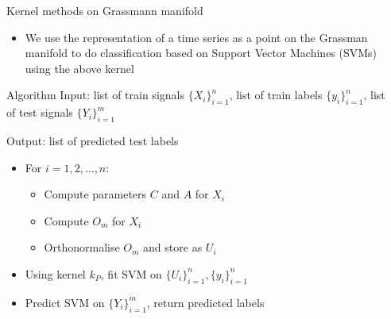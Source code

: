 \documentclass[final]{beamer}
\newlength{\sepwid}
\newlength{\onecolwid}
\begin{document}
\begin{frame}[t]
\begin{columns}[t]
\begin{column}{\onecolwid}
\begin{block}{Kernel methods on Grassmann manifold}
\begin{itemize}
            where $[Y_i]$ is the subspace spanned by the columns of $Y_i$, $Y_1$ and $Y_2$ are
            matrices with orthonormal columns, and $\gamma$ is a hyperparameter
        
        \item We use the representation of a time series as a point on the Grassman manifold  to do classification based on Support Vector Machines (SVMs) using the above kernel
        
    \end{itemize}
\end{block}


\begin{block}{Algorithm}
    Input: list of train signals $\{X_i\}_{i=1}^n$, list of train labels $\{y_i\}_{i=1}^n$, list of
    test signals $\{Y_i\}_{i=1}^m$

    Output: list of predicted test labels
    \begin{itemize}
        \item For $i = 1, 2, \dots, n$:

            \begin{itemize}
                \item Compute parameters $C$ and $A$ for $X_i$
                \item Compute $O_m$ for $X_i$
                \item Orthonormalise $O_m$ and store as $U_i$
            \end{itemize}

        \item Using kernel $k_P$, fit SVM on $\{U_i\}_{i=1}^n, \{y_i\}_{i=1}^n$

        \item Predict SVM on $\{Y_i\}_{i=1}^m$, return predicted labels
    \end{itemize}
\end{block}


\end{column} %

\begin{column}{\sepwid}\end{column} %


\end{columns}
\end{frame}
\end{document}
